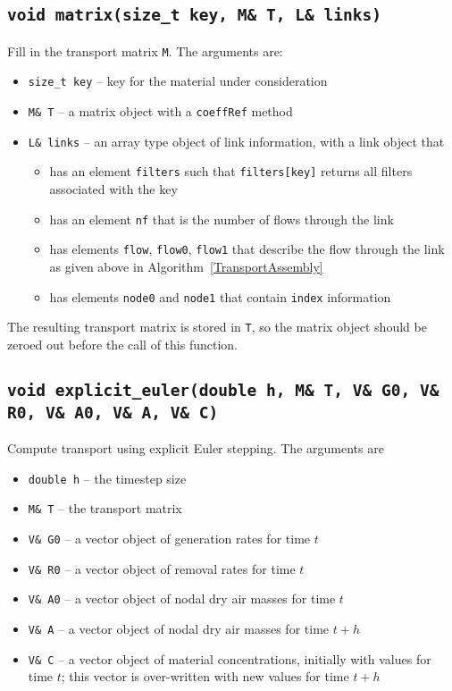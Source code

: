 \documentclass[10pt]{report}
\newcommand{\algoref}[1]{Algorithm~\ref{#1}}
\begin{document}
\subsection{\texttt{void matrix(size\_t key, M\& T, L\& links)}}
Fill in the transport matrix \texttt{M}. The arguments are:
\begin{itemize}
\item \texttt{size\_t key} -- key for the material under consideration
\item \texttt{M\& T} -- a matrix object with a \texttt{coeffRef} method
\item \texttt{L\& links} -- an array type object of link information, with a link object that
\begin{itemize}
\item has an element \texttt{filters} such that \texttt{filters[key]} returns all filters associated with the key
\item has an  element \texttt{nf} that is the number of flows through the link
\item has elements \texttt{flow}, \texttt{flow0}, \texttt{flow1} that describe the flow through the link as given above in \algoref{TransportAssembly}
\item has elements \texttt{node0} and \texttt{node1} that contain \texttt{index} information
\end{itemize}
\end{itemize}
The resulting transport matrix is stored in \texttt{T}, so the matrix object should be
zeroed out before the call of this function.
\subsection{\texttt{void explicit\_euler(double h, M\& T, V\& G0, V\& R0, V\& A0, V\& A, V\& C)}}
Compute transport using explicit Euler stepping. The arguments are
\begin{itemize}
\item \texttt{double h} -- the timestep size
\item \texttt{M\& T} -- the transport matrix
\item \texttt{V\& G0} -- a vector object of generation rates for time $t$
\item \texttt{V\& R0} -- a vector object of removal rates for time $t$
\item \texttt{V\& A0} -- a vector object of nodal dry air masses for time $t$
\item \texttt{V\& A} -- a vector object of nodal dry air masses for time $t+h$
\item \texttt{V\& C} -- a vector object of material concentrations, initially with values for time $t$; this vector is over-written with new values for time $t+h$
\end{itemize}
\end{document}
